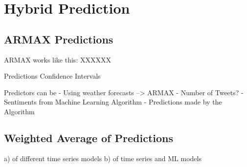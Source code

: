 \section{Hybrid Prediction}

\subsection{ARMAX Predictions}
ARMAX works like this: 
XXXXXX

Predictions
Confidence Intervals


Predictors can be 
- Using weather forecasts --> ARMAX
- Number of Tweets?
- Sentiments from Machine Learning Algorithm
- Predictions made by the Algorithm



\subsection{Weighted Average of Predictions}
a) of different time series models
b) of time series and ML models